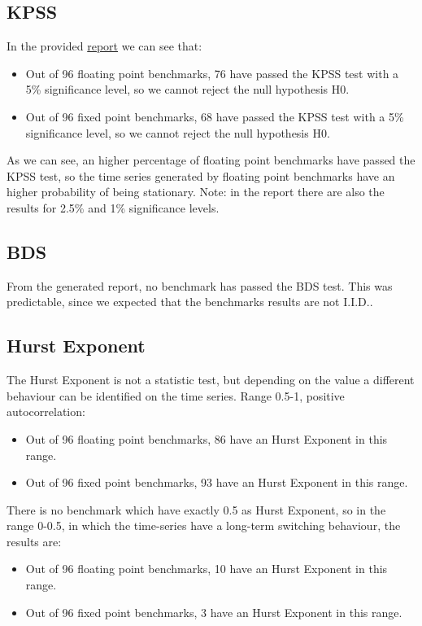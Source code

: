 \subsection{KPSS}
In the provided \href{../statistics/tests\_results.txt}{report} we can see that:
\begin{itemize}
	\item Out of 96 floating point benchmarks, 76 have passed the KPSS test with a 5\% significance level, so we cannot reject the null hypothesis H0.
	\item Out of 96 fixed point benchmarks, 68 have passed the KPSS test with a 5\% significance level, so we cannot reject the null hypothesis H0.
\end{itemize}
As we can see, an higher percentage of floating point benchmarks have passed the KPSS test, so the time series generated by floating point benchmarks have an higher probability of being stationary.\newline
Note: in the report there are also the results for 2.5\% and 1\% significance levels.

\subsection{BDS}
From the generated report, no benchmark has passed the BDS test. This was predictable, since we expected that the benchmarks results are not I.I.D..

\subsection{Hurst Exponent}
The Hurst Exponent is not a statistic test, but depending on the value a different behaviour can be identified on the time series.\newline
Range 0.5-1, positive autocorrelation:
\begin{itemize}
	\item Out of 96 floating point benchmarks, 86 have an Hurst Exponent in this range.
	\item Out of 96 fixed point benchmarks, 93 have an Hurst Exponent in this range.
\end{itemize}
There is no benchmark which have exactly 0.5 as Hurst Exponent, so in the range 0-0.5, in which the time-series have a long-term switching behaviour, the results are:
\begin{itemize}
	\item Out of 96 floating point benchmarks, 10 have an Hurst Exponent in this range.
	\item Out of 96 fixed point benchmarks, 3 have an Hurst Exponent in this range.
\end{itemize}

